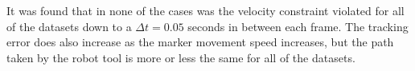 
It was found that in none of the cases was the velocity constraint violated for all of the datasets down to a $\Delta t = 0.05$ seconds in between each frame.
The tracking error does also increase as the marker movement speed increases, but the path taken by the robot tool is more or less the same for all of the datasets.


